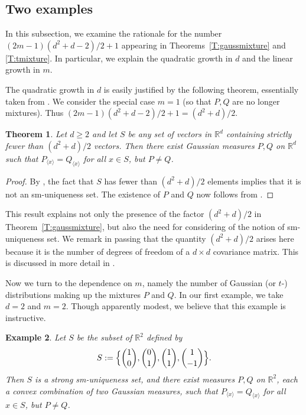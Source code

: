 \documentclass[11pt]{amsart}
\theoremstyle{plain}
\newtheorem{theorem}{Theorem}[section]
\newtheorem{example}[theorem]{Example}
\theoremstyle{remark}
\newcommand{\RR}{\mathbb{R}}
\begin{document}

\subsection{Two examples}

In this subsection, we examine the
rationale for the number $(2m-1)(d^2+d-2)/2+1$ appearing in
Theorems~\ref{T:gaussmixture} and \ref{T:tmixture}.
In particular, we explain the quadratic growth in $d$ and the linear growth
in $m$.

The quadratic growth in $d$ is easily justified by the
following theorem,  essentially taken from \cite{FMR23a}.
We consider the special case $m=1$ 
(so that $P,Q$ are no longer mixtures). 
Thus $(2m-1)(d^2+d-2)/2+1=(d^2+d)/2$.

\begin{theorem}
Let $d\ge2$ and let $S$ be any set of vectors in $\RR^d$ containing strictly fewer than $(d^2+d)/2$ vectors. Then there exist Gaussian measures $P,Q$ on $\RR^d$ such that $P_{\langle x\rangle}=Q_{\langle x\rangle}$ for all $x\in S$, but $P\ne Q$.
\end{theorem}

\begin{proof}
By \cite[Proposition~2]{FMR23a}, the fact that $S$ has fewer
than $(d^2+d)/2$ elements implies that it is not an sm-uniqueness set. The existence of $P$ and $Q$ now follows from 
\cite[Theorem~2]{FMR23a}.
\end{proof}

This result explains not only the  presence of the factor
$(d^2+d)/2$ in Theorem~\ref{T:gaussmixture}, but also the need
for considering of the notion of sm-uniqueness set. 
We remark in passing that the quantity $(d^2+d)/2$ arises here because it is the number of degrees of freedom of a $d\times d$
covariance matrix. This is discussed in more detail in 
\cite[Section~2]{FMR23a}.



Now we turn to the dependence on $m$,
namely the number of Gaussian (or $t$-)
distributions making up the mixtures $P$ and $Q$.
In our first example, we take $d=2$ and $m=2$.
Though apparently modest, we believe that this example 
is instructive.

\begin{example}\label{Ex:m=2}
Let $S$ be the subset of $\RR^2$ defined by
\[
S:=\Bigl\{
{1\choose0},{0\choose1},{1\choose1},{1\choose-1}\Bigr\}.
\]
Then $S$ is a strong sm-uniqueness set,
and there exist measures $P,Q$ on $\RR^2$, 
each a convex combination of two Gaussian measures, 
such that $P_{\langle x\rangle}=Q_{\langle x\rangle}$
for all $x\in S$, but $P\ne Q$.
\end{example}
\end{document}

